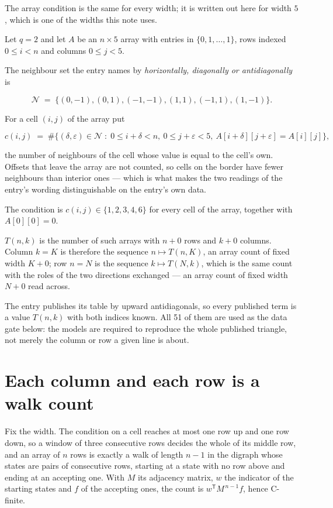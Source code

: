 \documentclass[11pt]{article}
\theoremstyle{definition}
\begin{document}
The array condition is the same for every width; it is written out here for width $5$, which is one of the widths this note uses.

Let $q = 2$ and let $A$ be an $n \times 5$ array with entries in $\{0,1,\dots,1\}$, rows indexed $0 \le i < n$ and columns $0 \le j < 5$.

The neighbour set the entry names by {\itshape horizontally, diagonally or antidiagonally} is

\[\mathcal{N} \;=\; \{(0,-1), (0,1), (-1,-1), (1,1), (-1,1), (1,-1)\}.\]

For a cell $(i,j)$ of the array put

\[c(i,j) \;=\; \#\bigl\{(\delta,\varepsilon)\in\mathcal{N} \;:\; 0\le i+\delta<n,\ 0\le j+\varepsilon<5,\ A[i+\delta][j+\varepsilon] = A[i][j]\bigr\},\]

the number of neighbours of the cell whose value is equal to the cell's own. Offsets that leave the array are not counted, so cells on the border have fewer neighbours than interior ones --- which is what makes the two readings of the entry's wording distinguishable on the entry's own data.

The condition is $c(i,j) \in \{1, 2, 3, 4, 6\}$ for every cell of the array, together with $A[0][0]=0$.

$T(n,k)$ is the number of such arrays with $n + 0$ rows and $k + 0$ columns. Column $k = K$ is therefore the sequence $n \mapsto T(n,K)$, an array count of fixed width $K + 0$; row $n = N$ is the sequence $k \mapsto T(N,k)$, which is the same count with the roles of the two directions exchanged --- an array count of fixed width $N + 0$ read across.

The entry publishes its table by upward antidiagonals, so every published term is a value $T(n,k)$ with both indices known. All 51 of them are used as the data gate below: the models are required to reproduce the whole published triangle, not merely the column or row a given line is about.

\section{Each column and each row is a walk count}

Fix the width. The condition on a cell reaches at most one row up and one row down, so a window of three consecutive rows decides the whole of its middle row, and an array of $n$ rows is exactly a walk of length $n-1$ in the digraph whose states are pairs of consecutive rows, starting at a state with no row above and ending at an accepting one. With $M$ its adjacency matrix, $w$ the indicator of the starting states and $f$ of the accepting ones, the count is $w^{\mathsf T}M^{\,n-1}f$, hence C-finite.
\end{document}
